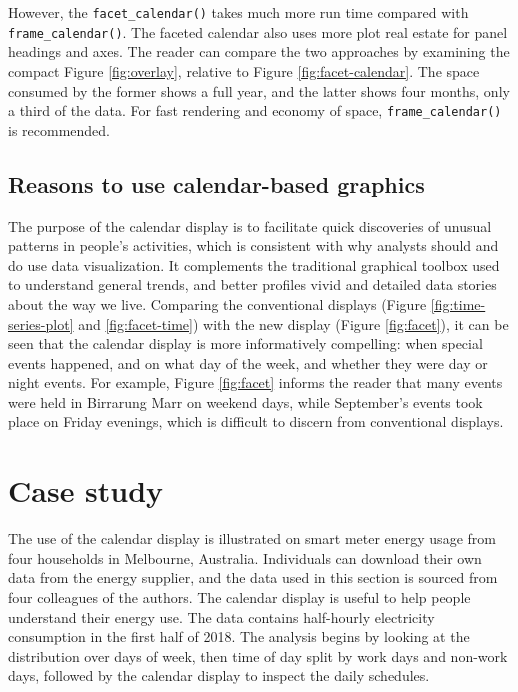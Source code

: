\documentclass[12pt]{article}
\begin{document}
However, the \texttt{facet\_calendar()} takes much more run time compared with \texttt{frame\_calendar()}. The faceted calendar also uses more plot real estate for panel headings and axes. The reader can compare the two approaches by examining the compact Figure \ref{fig:overlay}, relative to Figure \ref{fig:facet-calendar}. The space consumed by the former shows a full year, and the latter shows four months, only a third of the data. For fast rendering and economy of space, \texttt{frame\_calendar()} is recommended.

\hypertarget{reasons-to-use-calendar-based-graphics}{%
\subsection{Reasons to use calendar-based graphics}\label{reasons-to-use-calendar-based-graphics}}

The purpose of the calendar display is to facilitate quick discoveries of unusual patterns in people's activities, which is consistent with why analysts should and do use data visualization. It complements the traditional graphical toolbox used to understand general trends, and better profiles vivid and detailed data stories about the way we live. Comparing the conventional displays (Figure \ref{fig:time-series-plot} and \ref{fig:facet-time}) with the new display (Figure \ref{fig:facet}), it can be seen that the calendar display is more informatively compelling: when special events happened, and on what day of the week, and whether they were day or night events. For example, Figure \ref{fig:facet} informs the reader that many events were held in Birrarung Marr on weekend days, while September's events took place on Friday evenings, which is difficult to discern from conventional displays.

\hypertarget{sec:case}{%
\section{Case study}\label{sec:case}}

The use of the calendar display is illustrated on smart meter energy usage from four households in Melbourne, Australia. Individuals can download their own data from the energy supplier, and the data used in this section is sourced from four colleagues of the authors. The calendar display is useful to help people understand their energy use. The data contains half-hourly electricity consumption in the first half of 2018. The analysis begins by looking at the distribution over days of week, then time of day split by work days and non-work days, followed by the calendar display to inspect the daily schedules.
\end{document}

